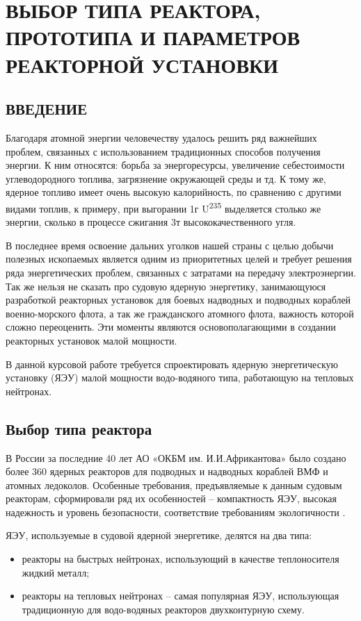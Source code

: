 \chapter{ВЫБОР ТИПА РЕАКТОРА, ПРОТОТИПА И ПАРАМЕТРОВ РЕАКТОРНОЙ
УСТАНОВКИ}

\section{ВВЕДЕНИЕ}

Благодаря атомной энергии человечеству удалось решить ряд важнейших
проблем, связанных с использованием традиционных способов получения
энергии. К ним относятся: борьба за энергоресурсы, увеличение
себестоимости углеводородного топлива, загрязнение окружающей среды и
тд. К тому же, ядерное топливо имеет очень высокую калорийность, по
сравнению с другими видами топлив, к примеру, при выгорании 1г
U\textsuperscript{235} выделяется столько же энергии, сколько в процессе
сжигания 3т высококачественного угля.

В последнее время освоение дальних уголков нашей страны с целью добычи
полезных ископаемых является одним из приоритетных целей и требует
решения ряда энергетических проблем, связанных с затратами на передачу
электроэнергии. Так же нельзя не сказать про судовую ядерную энергетику,
занимающуюся разработкой реакторных установок для боевых надводных и
подводных кораблей военно-морского флота, а так же гражданского атомного
флота, важность которой сложно переоценить. Эти моменты являются
основополагающими в создании реакторных установок малой мощности.

В данной курсовой работе требуется спроектировать ядерную энергетическую
установку (ЯЭУ) малой мощности водо-водяного типа, работающую на
тепловых нейтронах.


\section{Выбор типа реактора}

В России за последние 40 лет АО «ОКБМ им. И.И.Африкантова» было создано
более 360 ядерных реакторов для подводных и надводных кораблей ВМФ и
атомных ледоколов. Особенные требования, предъявляемые к данным судовым
реакторам, сформировали ряд их особенностей -- компактность ЯЭУ, высокая
надежность и уровень безопасности, соответствие требованиям
экологичности \cite{peb}.

ЯЭУ, используемые в судовой ядерной энергетике, делятся на два типа:

\begin{itemize}
\item
  реакторы на быстрых нейтронах, использующий в качестве теплоносителя
  жидкий металл;
\item
  реакторы на тепловых нейтронах -- самая популярная ЯЭУ, использующая
  традиционную для водо-водяных реакторов двухконтурную схему.
\end{itemize}

